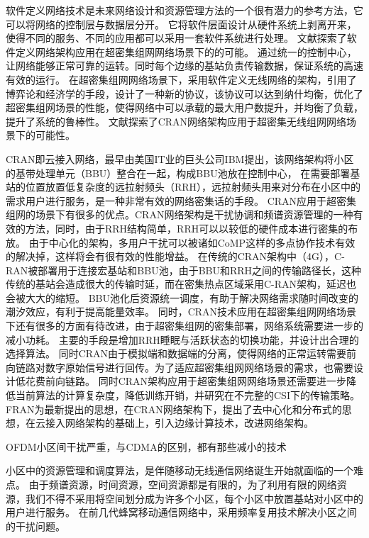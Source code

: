软件定义网络技术是未来网络设计和资源管理方法的一个很有潜力的参考方法，它可以将网络的控制层与数据层分开。
它将软件层面设计从硬件系统上剥离开来，使得不同的服务、不同的应用都可以采用一套软件系统进行处理。
文献\cite{condesign}探索了软件定义网络架构应用在超密集组网网络场景下的的可能。
通过统一的控制中心，让网络能够正常可靠的运转。同时每个边缘的基站负责传输数据，保证系统的高速有效的运行。
在超密集组网网络场景下，采用软件定义无线网络的架构，引用了博弈论和经济学的手段，设计了一种新的协议，该协议可以达到纳什均衡，优化了超密集组网场景的性能，使得网络中可以承载的最大用户数提升，并均衡了负载，提升了系统的鲁棒性。
文献\cite{CRANUDN}探索了CRAN网络架构应用于超密集无线组网网络场景下的可能性。

CRAN即云接入网络，最早由美国IT业的巨头公司IBM提出，该网络架构将小区的基带处理单元（BBU）整合在一起，构成BBU池放在控制中心，
在需要部署基站的位置放置低复杂度的远拉射频头（RRH），远拉射频头用来对分布在小区中的需求用户进行服务，是一种非常有效的网络密集话的手段。
CRAN应用于超密集组网的场景下有很多的优点。CRAN网络架构是干扰协调和频谱资源管理的一种有效的方法，同时，由于RRH结构简单，RRH可以以较低的硬件成本进行密集的布放。
由于中心化的架构，多用户干扰可以被诸如CoMP这样的多点协作技术有效的解决掉，这样将会有很有效的性能增益。
在传统的CRAN架构中（4G），C-RAN被部署用于连接宏基站和BBU池，由于BBU和RRH之间的传输路径长，这种传统的基站会造成很大的传输时延，而在密集热点区域采用C-RAN架构，延迟也会被大大的缩短。
BBU池化后资源统一调度，有助于解决网络需求随时间改变的潮汐效应，有利于提高能量效率。
同时，CRAN技术应用在超密集组网网络场景下还有很多的方面有待改进，由于超密集组网的密集部署，网络系统需要进一步的减小功耗。
主要的手段是增加RRH睡眠与活跃状态的切换功能，并设计出合理的选择算法。
同时CRAN由于模拟端和数据端的分离，使得网络的正常运转需要前向链路对数字原始信号进行回传。为了适应超密集组网网络场景的需求，也需要设计低花费前向链路。
同时CRAN架构应用于超密集组网网络场景还需要进一步降低当前算法的计算复杂度，降低训练开销，并研究在不完整的CSI下的传输策略。
FRAN为最新提出的思想，在CRAN网络架构下，提出了去中心化和分布式的思想，在云接入网络架构的基础上，引入边缘计算技术，改进网络架构。


OFDM小区间干扰严重，与CDMA的区别，都有那些减小的技术

小区中的资源管理和调度算法，是伴随移动无线通信网络诞生开始就面临的一个难点。
由于频谱资源，时间资源，空间资源都是有限的，为了利用有限的网络资源，我们不得不采用将空间划分成为许多个小区，每个小区中放置基站对小区中的用户进行服务。
在前几代蜂窝移动通信网络中，采用频率复用技术解决小区之间的干扰问题。

